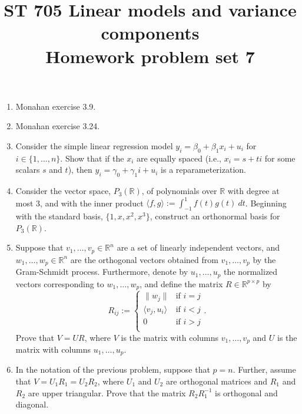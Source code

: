 \documentclass[11pt]{article}
\title{ST 705 Linear models and variance components \\ 
        Homework problem set 7}
\begin{document}
\maketitle

\begin{enumerate}

\item Monahan exercise 3.9.

\item Monahan exercise 3.24.

\item Consider the simple linear regression model $y_{i} = \beta_{0} + \beta_{1}x_{i} + u_{i}$ for $i \in \{1,\dots,n\}$.  Show that if the $x_{i}$ are equally spaced (i.e., $x_{i} = s + ti$ for some scalars $s$ and $t$), then $y_{i} = \gamma_{0} + \gamma_{1}i + u_{i}$ is a reparameterization.

\item Consider the vector space, $P_{3}(\mathbb{R})$, of polynomials over $\mathbb{R}$ with degree at most 3, and with the inner product $\langle f, g\rangle := \int_{-1}^{1}f(t)g(t) \ dt$.  Beginning with the standard basis, $\{1, x, x^{2}, x^{3}\}$, construct an orthonormal basis for $P_{3}(\mathbb{R})$.

\item Suppose that $v_{1},\dots,v_{p} \in \mathbb{R}^{n}$ are a set of linearly independent vectors, and $w_{1},\dots,w_{p} \in \mathbb{R}^{n}$ are the orthogonal vectors obtained from $v_{1},\dots,v_{p}$ by the Gram-Schmidt process.  Furthermore, denote by $u_{1},\dots,u_{p}$ the normalized vectors corresponding to $w_{1},\dots,w_{p}$, and define the matrix $R \in \mathbb{R}^{p\times p}$ by
\[
R_{ij} :=
\begin{cases}
\|w_{j}\| & \text{if } i=j \\
\langle v_{j}, u_i\rangle & \text{if } i<j \\
0 & \text{if } i>j \\
\end{cases}.
\]
Prove that $V = UR$, where $V$ is the matrix with columns $v_{1},\dots,v_{p}$ and $U$ is the matrix with columns $u_{1},\dots,u_{p}$.

\item In the notation of the previous problem, suppose that $p = n$.  Further, assume that $V = U_{1}R_{1} = U_{2}R_{2}$, where $U_{1}$ and $U_{2}$ are orthogonal matrices and $R_{1}$ and $R_{2}$ are upper triangular.  Prove that the matrix $R_{2}R_{1}^{-1}$ is orthogonal and diagonal.

\end{enumerate}
\end{document}
